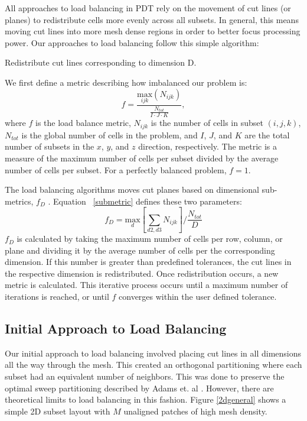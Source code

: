 \documentclass[letterpaper]{mandc2019}
\begin{document}
All approaches to load balancing in PDT rely on the movement of cut lines (or planes) to redistribute cells more evenly across all subsets. In general, this means moving cut lines into more mesh dense regions in order to better focus processing power. Our approaches to load balancing follow this simple algorithm:

\begin{algorithm}[H]
\begin{algorithmic}
		\STATE Redistribute cut lines corresponding to dimension D.
	\ENDIF	
\ENDFOR
\ENDWHILE
\end{algorithmic}
\end{algorithm}

We first define a metric describing how imbalanced our problem is:
\begin{equation}
f =\frac{\underset{ijk}{\text{max}}(N_{ijk})}{\frac{N_{tot}}{I\cdot J\cdot K}},
\label{metric_def}
\end{equation}
where $f$ is the load balance metric, $N_{ijk}$ is the number of cells in subset $(i,j,k)$, $N_{tot}$ is the global number of cells in the problem, and $I$, $J$, and $K$ are the total number of subsets in the $x$, $y$, and $z$ direction, respectively. The metric is a measure of the maximum number of cells per subset divided by the average number of cells per subset. For a perfectly balanced problem, $f = 1$.

The load balancing algorithms moves cut planes based on dimensional sub-metrics, $f_D$ . Equation ~\eqref{submetric} defines these two parameters:
\begin{equation}
f_{D} = \underset{d}{\text{max}}[\sum_{d2,d3} N_{ijk}]/\frac{N_{tot}}{D}
\label{submetric}
\end{equation}
$f_{D}$ is calculated by taking the maximum number of cells per row, column, or plane and dividing it by the average number of cells per the corresponding dimension. If this number is greater than predefined tolerances, the cut lines in the respective dimension is redistributed. Once redistribution occurs, a new metric is calculated. This iterative process occurs until a maximum number of iterations is reached, or until $f$ converges within the user defined tolerance.

\subsection{Initial Approach to Load Balancing}
Our initial approach to load balancing involved placing cut lines in all dimensions all the way through the mesh. This created an orthogonal partitioning where each subset had an equivalent number of neighbors. This was done to preserve the optimal sweep partitioning described by Adams et. al \cite{mpadams2015}. However, there are theoretical limits to load balancing in this fashion. Figure \ref{2dgeneral} shows a simple 2D subset layout with $M$ unaligned patches of high mesh density.
\end{document}
